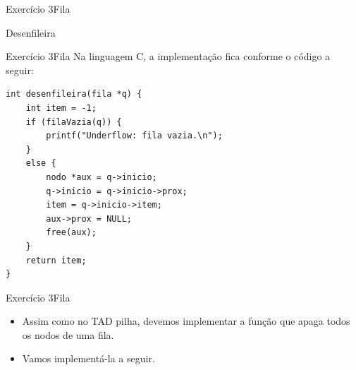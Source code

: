 \documentclass[aspectratio=169]{beamer}
\begin{document}

\begin{frame}[fragile]{Exercício 3}{Fila}
\begin{algorithm}[H]
\caption{Desenfileira} 
\label{Desenfileira}
\end{algorithm}
\end{frame}	


\begin{frame}[fragile]{Exercício 3}{Fila}
Na linguagem C, a implementação fica conforme o código a seguir:
\begin{lstlisting}[style=CStyle]
int desenfileira(fila *q) {
    int item = -1;
    if (filaVazia(q)) {
        printf("Underflow: fila vazia.\n");
    }
    else {
        nodo *aux = q->inicio;
        q->inicio = q->inicio->prox;
        item = q->inicio->item;
        aux->prox = NULL;
        free(aux);
    }
    return item;
}
\end{lstlisting}  
\end{frame}


\begin{frame}[fragile]{Exercício 3}{Fila}
\begin{itemize}
\item Assim como no TAD pilha, devemos implementar a função que apaga todos os nodos de uma fila.
\item Vamos implementá-la a seguir.
\end{itemize}
\end{frame}

\end{document}
